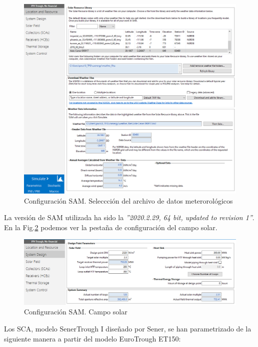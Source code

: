 \begin{figure}[H]
\includegraphics[width=0.9\linewidth]{images/captura_sam_iph01.png}
\caption{Configuración SAM. Seleccción del archivo de datos meterorológicos} 
\label{fig:captura01}
\end{figure}

La versión de SAM utilizada ha sido la \emph{''2020.2.29, 64 bit, updated to revision 1''}. En la Fig.\ref{fig:captura02} podemos ver la pestaña de configuración del campo solar. 

\begin{figure}[H]
\includegraphics[width=0.9\linewidth]{images/captura_sam_iph02.png}
\caption{Configuración SAM. Campo solar} 
\label{fig:captura02}
\end{figure}

Los SCA, modelo SenerTrough I diseñado por Sener, se han parametrizado de la siguiente manera a partir del modelo EuroTrough ET150:

